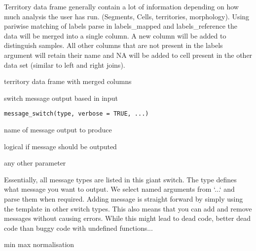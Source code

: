 \documentclass[a4paper]{book}
\begin{document}
%
\begin{Details}
Territory data frame generally contain a lot of information 
depending on how much analysis the user has run. 
(Segments, Cells, territories, morphology). 
Using pariwise matching of labels parse in labels\_mapped and labels\_reference
the data will be merged into a single column. 
A new column will be added to distinguish samples. All other columns that are not
present in the labels argument will retain their name and NA will be added 
to cell present in the other data set (similar to left and right joins).
\end{Details}
%
\begin{Value}
territory data frame with merged columns
\end{Value}
%
\begin{Description}
switch message output based in input
\end{Description}
%
\begin{Usage}
\begin{verbatim}
message_switch(type, verbose = TRUE, ...)
\end{verbatim}
\end{Usage}
%
\begin{Arguments}
\begin{ldescription}
\item[\code{type}] name of message output to produce

\item[\code{verbose}] logical if message should be outputed

\item[\code{...}] any other parameter
\end{ldescription}
\end{Arguments}
%
\begin{Details}
Essentially, all message types are listed in this giant switch.
The type defines what message you want to output. We select named
arguments from `...` and parse them when required.
Adding message is straight forward by simply using the template in 
other switch types. This also means that you can add and remove messages
without causing errors. While this might lead to dead code, better dead
code than buggy code with undefined functions...
\end{Details}
%
\begin{Description}
min max normalisation
\end{Description}
\end{document}
